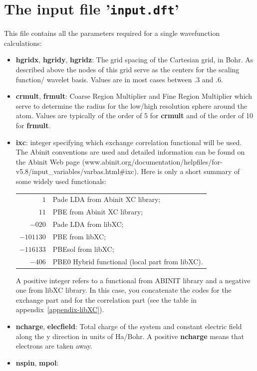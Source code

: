\documentclass[a4paper,11pt]{report}
\begin{document}
\section{The input file '\texttt{input.dft}'}
This file contains all the parameters required for a single wavefunction calculations:
\begin{itemize}
\item {\bf hgridx}, {\bf hgridy}, {\bf hgridz}: The grid spacing of the Cartesian grid, in Bohr. As 
       described above the nodes of this grid serve as the centers for the scaling function/ wavelet basis. 
       Values are in most cases between $.3$ and $.6$.

\item {\bf crmult}, {\bf frmult}: Coarse Region Multiplier and Fine Region Multiplier which serve to determine the radius
      for the low/high resolution sphere around the atom. 
      Values are typically of the order of 5 for {\bf crmult} and of the order of 10 for  {\bf frmult}.
\item {\bf ixc}: integer specifying which exchange correlation functional will be used. The Abinit conventions are 
      used and detailed information can be found on the Abinit Web page 
      (www.abinit.org/documentation/helpfiles/for-v5.8/in\-put\_variables/varbas.html\#ixc). 
      Here is only a short summary of some wide\-ly used functionals:\\
      \begin{tabular}{rl}
      {$1$}       & Pade LDA from Abinit XC library;\\
      {$11$}      & PBE from Abinit XC library;\\
      {$-020$}    & Pade LDA from libXC;\\
      {$-101130$} & PBE from libXC;\\
      {$-116133$} & PBEsol from libXC; \\ 
      {$-406$}    & PBE0 Hybrid functional (local part from libXC).
      \end{tabular}
      A positive integer refers to a functional from ABINIT library and a negative one from libXC
      library. In this case, you concatenate the codes for the exchange part and for the correlation part
      (see the table in appendix~\ref{appendix-libXC}).
\item {\bf ncharge}, {\bf elecfield}: Total charge of the system and constant electric field along the y direction in units of Ha/Bohr. 
      A positive {\bf ncharge} means that electrons are taken away.
\item {\bf nspin}, {\bf mpol}: 

\end{itemize}
\end{document}
